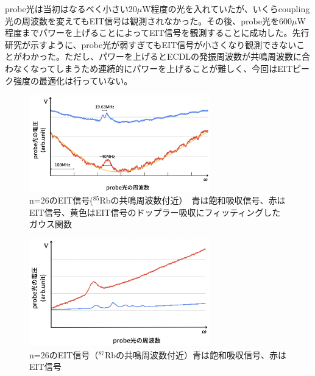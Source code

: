 \documentclass[dvipdfmx]{jsreport}
\begin{document}
probe光は当初はなるべく小さい20$\mu$W程度の光を入れていたが、いくらcoupling光の周波数を変えてもEIT信号は観測されなかった。その後、probe光を600$\mu$W程度までパワーを上げることによってEIT信号を観測することに成功した。先行研究\cite{optimize}が示すように、probe光が弱すぎてもEIT信号が小さくなり観測できないことがわかった。ただし、パワーを上げるとECDLの発振周波数が共鳴周波数に合わなくなってしまうため連続的にパワーを上げることが難しく、今回はEITピーク強度の最適化は行っていない。

\begin{figure}[hbtp]
\centering
\includegraphics[width=0.7\textwidth]{images/eit26.png}
\caption{\label{fig:eit26}n=26のEIT信号($^{85}$Rbの共鳴周波数付近）　青は飽和吸収信号、赤はEIT信号、黄色はEIT信号のドップラー吸収にフィッティングしたガウス関数}
\end{figure}
\begin{figure}[hbtp]
\centering
\includegraphics[width=0.7\textwidth]{images/eit87.png}
\caption{\label{fig:eit87}n=26のEIT信号（$^{87}$Rbの共鳴周波数付近）青は飽和吸収信号、赤はEIT信号}
\end{figure}
\end{document}
